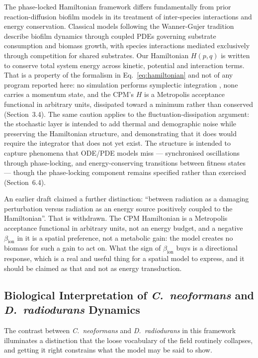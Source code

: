 \documentclass[11pt]{article}
\begin{document}
The phase-locked Hamiltonian framework differs fundamentally from prior reaction-diffusion
biofilm models in its treatment of inter-species interactions and energy conservation.
Classical models following the Wanner-Gujer tradition \cite{wanner1986} describe biofilm
dynamics through coupled PDEs governing substrate consumption and biomass growth, with species
interactions mediated exclusively through competition for shared substrates. Our Hamiltonian
$H(p,q)$ is written to conserve total system energy across kinetic, potential and interaction
terms. That is a property of the formalism in Eq.~\ref{eq:hamiltonian} and not of any program
reported here: no simulation performs symplectic integration \cite{hairer2006}, none carries a
momentum state, and the CPM's $H$ is a Metropolis acceptance functional in arbitrary units,
dissipated toward a minimum rather than conserved (Section~3.4). The same caution applies to the
fluctuation-dissipation argument: the stochastic layer is intended to add thermal and demographic
noise while preserving the Hamiltonian structure, and demonstrating that it does would require the
integrator that does not yet exist. The structure is intended to capture phenomena that ODE/PDE
models miss --- synchronised oscillations through phase-locking, and energy-conserving transitions
between fitness states --- though the phase-locking component remains specified rather than
exercised (Section~6.4).

An earlier draft claimed a further distinction: ``between radiation as a damaging perturbation
versus radiation as an energy source positively coupled to the Hamiltonian''. That is withdrawn.
The CPM Hamiltonian is a Metropolis acceptance functional in arbitrary units, not an energy budget,
and a negative $\beta_{\mathrm{ion}}$ in it is a spatial preference, not a metabolic gain: the
model creates no biomass for such a gain to act on. What the sign of $\beta_{\mathrm{ion}}$ buys is
a directional response, which is a real and useful thing for a spatial model to express, and it
should be claimed as that and not as energy transduction.

\subsection{Biological Interpretation of \textit{C.\ neoformans} and \textit{D.\ radiodurans} Dynamics}

The contrast between \textit{C.\ neoformans} and \textit{D.\ radiodurans} in this framework
illuminates a distinction that the loose vocabulary of the field routinely collapses, and getting
it right constrains what the model may be said to show.
\end{document}
